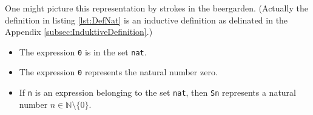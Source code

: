 	 One might picture this representation by strokes in the beergarden.  
	 (Actually the definition in listing \ref{lst:DefNat} is an inductive definition as delinated in the Appendix \ref{subsec:InduktiveDefinition}.)	  
	  \begin{itemize}
	  \item The expression \lstinline!0! is in the set \lstinline!nat!.
	  \item The expression \lstinline!0! represents the natural number zero. 
	  \item If \lstinline!n! is an expression belonging to the set \lstinline!nat!, then \lstinline!Sn! represents a natural number $n\in\mathbb{N}\setminus\{ 0\}$.  
	  \end{itemize}	  
	  
